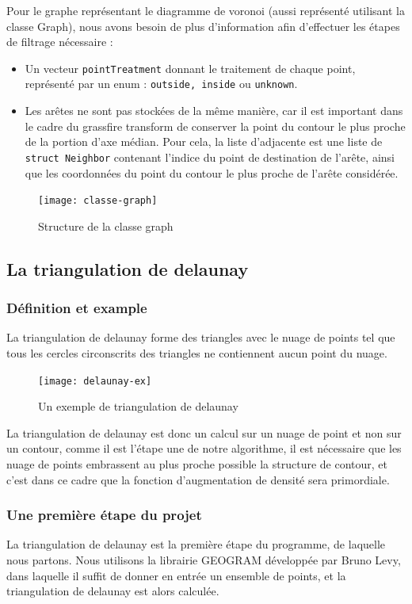 \documentclass[11pt]{article}
\begin{document}
\vspace{8mm}

Pour le graphe représentant le diagramme de voronoi (aussi représenté utilisant la classe Graph), nous avons besoin de plus d'information afin d'effectuer les étapes de filtrage nécessaire : 
\begin{itemize}
\item Un vecteur \texttt{pointTreatment} donnant le traitement de chaque point, représenté par un enum : \texttt{outside, inside} ou \texttt{unknown}.
\item Les arêtes ne sont pas stockées de la même manière, car il est important dans le cadre du grassfire transform de conserver la point du contour le plus proche de la portion d'axe médian. Pour cela, la liste d'adjacente est une liste de \texttt{struct Neighbor} contenant l'indice du point de destination de l'arête, ainsi que les coordonnées du point du contour le plus proche de l'arête considérée.
\end{itemize}

\begin{figure}
\centering
\texttt{[image: classe-graph]}
\caption{Structure de la classe graph}
\end{figure}


\subsection{La triangulation de delaunay}

\subsubsection{Définition et example}

La triangulation de delaunay forme des triangles avec le nuage de points tel que tous les cercles circonscrits des triangles ne contiennent aucun point du nuage.

\begin{figure}[h]
\centering
\texttt{[image: delaunay-ex]}
\caption{Un exemple de triangulation de delaunay}
\end{figure}

La triangulation de delaunay est donc un calcul sur un nuage de point et non sur un contour, comme il est l'étape une de notre algorithme, il est nécessaire que les nuage de points embrassent au plus proche possible la structure de contour, et c'est dans ce cadre que la fonction d'augmentation de densité sera primordiale.


\subsubsection{Une première étape du projet}
La triangulation de delaunay est la première étape du programme, de laquelle nous partons. Nous utilisons la librairie GEOGRAM développée par Bruno Levy, dans laquelle il suffit de donner en entrée un ensemble de points, et la triangulation de delaunay est alors calculée. 
\end{document}
